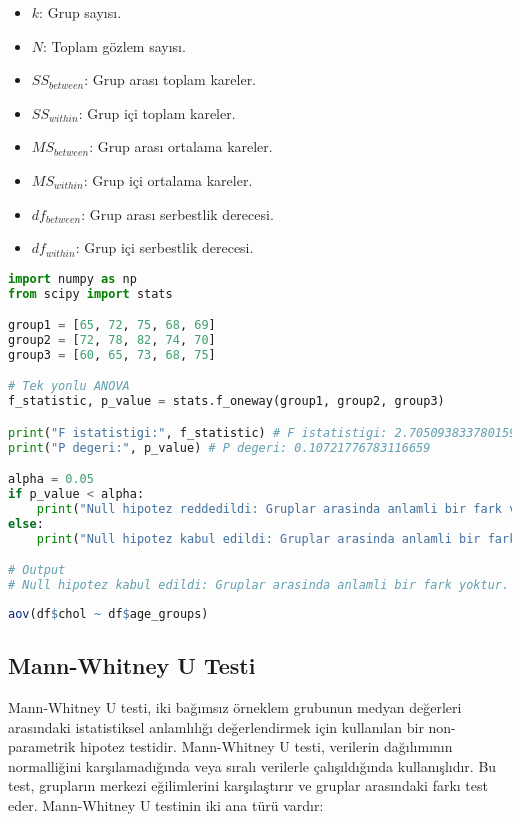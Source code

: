 \begin{itemize}
	\item $k$: Grup sayısı.
	\item $N$: Toplam gözlem sayısı.
	\item $SS_{between}$: Grup arası toplam kareler.
	\item $SS_{within}$: Grup içi toplam kareler.
	\item $MS_{between}$: Grup arası ortalama kareler.
	\item $MS_{within}$: Grup içi ortalama kareler.
	\item $df_{between}$: Grup arası serbestlik derecesi.
	\item $df_{within}$: Grup içi serbestlik derecesi.
\end{itemize}

\begin{lstlisting}[language=Python]
import numpy as np
from scipy import stats

group1 = [65, 72, 75, 68, 69]
group2 = [72, 78, 82, 74, 70]
group3 = [60, 65, 73, 68, 75]

# Tek yonlu ANOVA 
f_statistic, p_value = stats.f_oneway(group1, group2, group3)

print("F istatistigi:", f_statistic) # F istatistigi: 2.7050938337801593
print("P degeri:", p_value) # P degeri: 0.10721776783116659

alpha = 0.05
if p_value < alpha:
    print("Null hipotez reddedildi: Gruplar arasinda anlamli bir fark vardir.")
else:
    print("Null hipotez kabul edildi: Gruplar arasinda anlamli bir fark yoktur.")

# Output
# Null hipotez kabul edildi: Gruplar arasinda anlamli bir fark yoktur.
\end{lstlisting}

\begin{lstlisting}[language=R]
aov(df$chol ~ df$age_groups)
\end{lstlisting}

\newpage

\subsection{Mann-Whitney U Testi}
Mann-Whitney U testi, iki bağımsız örneklem grubunun medyan değerleri arasındaki istatistiksel anlamlılığı değerlendirmek için kullanılan bir non-parametrik hipotez testidir. Mann-Whitney U testi, verilerin dağılımının normalliğini karşılamadığında veya sıralı verilerle çalışıldığında kullanışlıdır. Bu test, grupların merkezi eğilimlerini karşılaştırır ve gruplar arasındaki farkı test eder. Mann-Whitney U testinin iki ana türü vardır:


